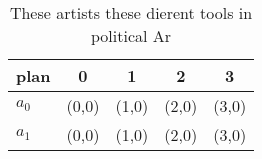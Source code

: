 \documentclass[a4paper]{article}
\begin{document}
\begin{table}
\begin{adjustbox}{width=0.7\columnwidth}
\begin{tabular}{|l|l|l|l|l|}
\hline
\textbf{plan} & \multicolumn{1}{c|}{\textbf{0}} & \multicolumn{1}{c|}{\textbf{1}} & \multicolumn{1}{c|}{\textbf{2}} & \multicolumn{1}{c|}{\textbf{3}} \\ \hline
\textbf{$a_0$}  & (0,0) & (1,0) & (2,0) & (3,0) \\ \hline
\textbf{$a_1$}  & (0,0) & (1,0) & (2,0) & (3,0) \\ \hline
\end{tabular}
\end{adjustbox}
\caption{These artists these dierent tools in political Ar
}
\end{table}
\end{document}
